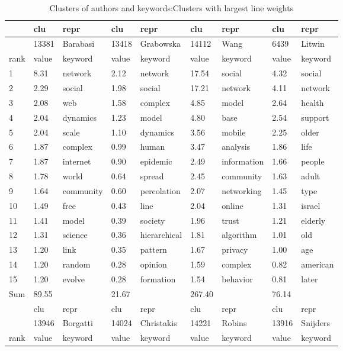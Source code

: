 \documentclass[11pt]{article} %
\begin{document}
\begin{center}
\begin{table}
\caption{Clusters of authors and keywords:\label{akw} Clusters with largest line weights}\medskip
\begin{tabular}{p{0.7cm}|p{1cm}|p{2cm}||p{1cm}|p{2cm}||p{1cm}|p{2.1cm}||p{1cm}|p{1.7cm}}
 &	clu &	repr &	clu &	repr &	clu &	repr &	clu &	repr \\ \hline
&	13381&	Barabasi&	13418&	Grabowska&	14112&	Wang&	6439&	Litwin\\\hline
rank&	value&	keyword&	value&	keyword&	value&	keyword&	value&	keyword\\ \hline
1&	8.31&	network&	2.12&	network&	17.54&	social&	4.32&	social\\
2&	2.29&	social&	1.98&	social&	17.21&	network&	4.11&	network\\
3&	2.08&	web&	1.58&	complex&	4.85&	model&	2.64&	health\\
4&	2.04&	dynamics&	1.23&	model&	4.80&	base&	2.54&	support\\
5&	2.04&	scale&	1.10&	dynamics&	3.56&	mobile&	2.25&	older\\
6&	1.87&	complex&	0.99&	human&	3.47&	analysis&	1.86&	life\\
7&	1.87&	internet&	0.90&	epidemic&	2.49&	information&	1.66&	people\\
8&	1.78&	world&	0.64&	spread&	2.45&	community&	1.63&	adult\\
9&	1.64&	community&	0.60&	percolation&	2.07&	networking&	1.45&	type\\
10&	1.49&	free&	0.43&	line&	2.04&	online&	1.31&	israel\\
11&	1.41&	model&	0.39&	society&	1.96&	trust&	1.21&	elderly\\
12&	1.31&	science&	0.36&	hierarchical&	1.81&	algorithm&	1.01&	old\\
13&	1.20&	link&	0.35&	pattern&	1.67&	privacy&	1.00&	age\\
14&	1.20&	random&	0.28&	opinion&	1.59&	complex&	0.82&	american\\
15&	1.20&	evolve&	0.28&	formation&	1.54&	behavior&	0.81&	later\\ \hline
Sum&	89.55&	&	21.67&	&	267.40&	&	76.14&	\\ \hline\hline
 &	clu &	repr &	clu &	repr &	clu &	repr &	clu &	repr \\ \hline
&	13946&	Borgatti&	14024&	Christakis&	14221&	Robins&	13916&	Snijders\\ \hline
rank&	value&	keyword&	value&	keyword&	value&	keyword&	value&	keyword\\ \hline

\end{tabular}
\end{table}
\end{center}
\end{document}
